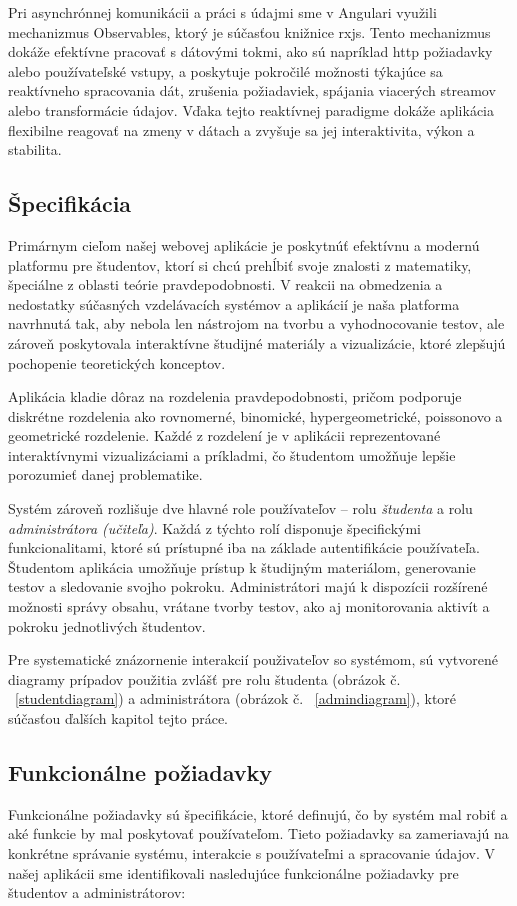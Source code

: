 Pri asynchrónnej komunikácii a práci s údajmi sme v Angulari využili mechanizmus Observables, ktorý je súčasťou knižnice \acrshort{rxjs}. Tento mechanizmus dokáže efektívne pracovať s dátovými tokmi, ako sú napríklad \acrshort{http} požiadavky alebo používateľské vstupy, a poskytuje pokročilé možnosti týkajúce sa reaktívneho spracovania dát, zrušenia požiadaviek, spájania viacerých streamov alebo transformácie údajov. Vďaka tejto reaktívnej paradigme dokáže aplikácia flexibilne reagovať na zmeny v dátach a zvyšuje sa jej interaktivita, výkon a stabilita.


\subsection{Špecifikácia}
Primárnym cieľom našej webovej aplikácie je poskytnúť efektívnu a modernú platformu pre študentov, ktorí si chcú prehĺbiť svoje znalosti z matematiky, špeciálne z oblasti teórie pravdepodobnosti.
 V reakcii na obmedzenia a nedostatky súčasných vzdelávacích systémov a aplikácií je naša platforma navrhnutá tak, aby nebola len nástrojom na tvorbu a vyhodnocovanie testov, ale zároveň poskytovala interaktívne študijné materiály a vizualizácie, ktoré zlepšujú pochopenie teoretických konceptov.

Aplikácia kladie dôraz na rozdelenia pravdepodobnosti, pričom podporuje diskrétne rozdelenia ako rovnomerné, binomické, hypergeometrické, poissonovo a geometrické rozdelenie.
 Každé z rozdelení je v aplikácii reprezentované interaktívnymi vizualizáciami a príkladmi, čo študentom umožňuje lepšie porozumieť danej problematike.

Systém zároveň rozlišuje dve hlavné role používateľov – rolu \textit{študenta} a rolu \textit{administrátora (učiteľa)}. Každá z týchto rolí disponuje špecifickými funkcionalitami, ktoré sú prístupné iba na základe autentifikácie používateľa.
 Študentom aplikácia umožňuje prístup k študijným materiálom, generovanie testov a sledovanie svojho pokroku.
  Administrátori majú k dispozícii rozšírené možnosti správy obsahu, vrátane tvorby testov, ako aj monitorovania aktivít a pokroku jednotlivých študentov.

  Pre systematické znázornenie interakcií použivateľov so systémom, sú vytvorené diagramy prípadov použitia zvlášť pre rolu študenta (obrázok č. ~\ref{studentdiagram}) a administrátora (obrázok č. ~\ref{admindiagram}), ktoré súčasťou ďalších kapitol tejto práce.

\subsection{Funkcionálne požiadavky}
Funkcionálne požiadavky sú špecifikácie, ktoré definujú, čo by systém mal robiť a aké funkcie by mal poskytovať používateľom.
 Tieto požiadavky sa zameriavajú na konkrétne správanie systému, interakcie s používateľmi a spracovanie údajov. 
 V našej aplikácii sme identifikovali nasledujúce funkcionálne požiadavky pre študentov a administrátorov:
